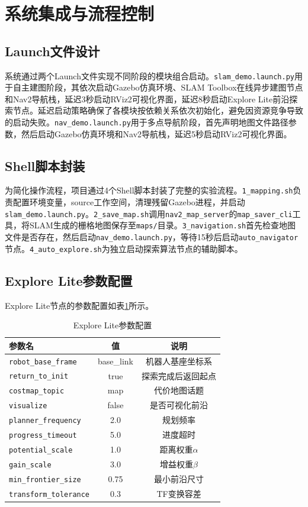 \documentclass[a4paper,12pt]{article}
\begin{document}
\section{系统集成与流程控制}

\subsection{Launch文件设计}

系统通过两个Launch文件实现不同阶段的模块组合启动。\texttt{slam\_demo.launch.py}用于自主建图阶段，其依次启动Gazebo仿真环境、SLAM Toolbox在线异步建图节点和Nav2导航栈，延迟3秒启动RViz2可视化界面，延迟8秒启动Explore Lite前沿探索节点。延迟启动策略确保了各模块按依赖关系依次初始化，避免因资源竞争导致的启动失败。\texttt{nav\_demo.launch.py}用于多点导航阶段，首先声明地图文件路径参数，然后启动Gazebo仿真环境和Nav2导航栈，延迟5秒启动RViz2可视化界面。

\subsection{Shell脚本封装}

为简化操作流程，项目通过4个Shell脚本封装了完整的实验流程。\texttt{1\_mapping.sh}负责配置环境变量，source工作空间，清理残留Gazebo进程，并启动\texttt{slam\_demo.launch.py}。\texttt{2\_save\_map.sh}调用\texttt{nav2\_map\_server}的\texttt{map\_saver\_cli}工具，将SLAM生成的栅格地图保存至\texttt{maps/}目录。\texttt{3\_navigation.sh}首先检查地图文件是否存在，然后启动\texttt{nav\_demo.launch.py}，等待15秒后启动\texttt{auto\_navigator}节点。\texttt{4\_auto\_explore.sh}为独立启动探索算法节点的辅助脚本。

\subsection{Explore Lite参数配置}

Explore Lite节点的参数配置如表\ref{tab:explore_params}所示。

\begin{table}[H]
\centering
\caption{Explore Lite参数配置}
\label{tab:explore_params}
\begin{tabular}{lcc}
\toprule
参数名 & 值 & 说明 \\
\midrule
\texttt{robot\_base\_frame} & base\_link & 机器人基座坐标系 \\
\texttt{return\_to\_init} & true & 探索完成后返回起点 \\
\texttt{costmap\_topic} & map & 代价地图话题 \\
\texttt{visualize} & false & 是否可视化前沿 \\
\texttt{planner\_frequency} & 2.0 & 规划频率 \\
\texttt{progress\_timeout} & 5.0 & 进度超时 \\
\texttt{potential\_scale} & 1.0 & 距离权重$\alpha$ \\
\texttt{gain\_scale} & 3.0 & 增益权重$\beta$ \\
\texttt{min\_frontier\_size} & 0.75 & 最小前沿尺寸 \\
\texttt{transform\_tolerance} & 0.3 & TF变换容差 \\
\bottomrule
\end{tabular}
\end{table}
\end{document}
